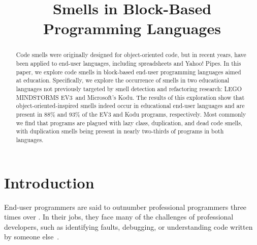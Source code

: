 \documentclass[conference]{IEEEtran}
\newcommand{\ms}{LEGO MINDSTORMS EV3}
\newcommand{\todo}[1]{\textbf{#1}}
\begin{document}
\title{Smells in Block-Based Programming Languages} %


\author{
\and
{}
\and
{}
}



\maketitle

\begin{abstract}
Code smells were originally designed for object-oriented code, but in recent years, have been applied to end-user languages, including spreadsheets and Yahoo! Pipes. In this paper, we explore code smells in block-based end-user programming languages aimed at  education. 
Specifically, we explore the occurrence of smells in two educational languages not previously targeted by smell detection and refactoring research: \ms~and Microsoft's Kodu. The results of this exploration show that object-oriented-inspired smells indeed occur in educational end-user languages and are present in 88\% and 93\% of the EV3 and Kodu programs, respectively. Most commonly we find that programs are plagued with lazy class, duplication, and dead code smells, with duplication smells being present in nearly two-thirds of programs in both languages. 
\end{abstract}


\section{Introduction}
End-user programmers are said to outnumber professional programmers three times over \cite{Scaf2005}. In their jobs, they face many of the challenges of professional developers, such as identifying faults, debugging, or understanding code written by someone else~\cite{Ko2011}. 
\end{document}
